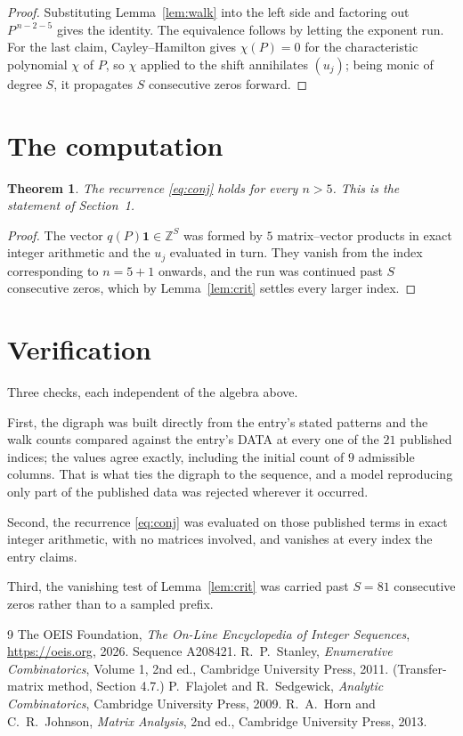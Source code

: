 \documentclass[11pt,a4paper]{article}
\theoremstyle{plain}
\newtheorem{theorem}{Theorem}
\theoremstyle{definition}
\begin{document}
\begin{proof}
Substituting Lemma~\ref{lem:walk} into the left side and factoring out
$P^{\,n-2-5}$ gives the identity. The equivalence follows by letting the exponent
run. For the last claim, Cayley--Hamilton gives $\chi(P)=0$ for the characteristic
polynomial $\chi$ of $P$, so $\chi$ applied to the shift annihilates $(u_j)$; being monic of
degree $S$, it propagates $S$ consecutive zeros forward.
\end{proof}

\section{The computation}

\begin{theorem}
The recurrence \eqref{eq:conj} holds for every $n>5$. This is the statement of
Section~1.
\end{theorem}

\begin{proof}
The vector $q(P)\mathbf{1}\in\mathbb{Z}^{S}$ was formed by $5$ matrix--vector
products in exact integer arithmetic and the $u_j$ evaluated in turn. They vanish from the
index corresponding to $n=5+1$ onwards, and the run was continued past $S$ consecutive
zeros, which by Lemma~\ref{lem:crit} settles every larger index.
\end{proof}

\section{Verification}

Three checks, each independent of the algebra above.

First, the digraph was built directly from the entry's stated patterns and the walk counts
compared against the entry's DATA at every one of the $21$ published indices; the
values agree exactly, including the initial count of $9$ admissible columns. That is
what ties the digraph to the sequence, and a model reproducing only part of the published
data was rejected wherever it occurred.

Second, the recurrence \eqref{eq:conj} was evaluated on those published terms in exact
integer arithmetic, with no matrices involved, and vanishes at every index the entry claims.

Third, the vanishing test of Lemma~\ref{lem:crit} was carried past $S=81$ consecutive
zeros rather than to a sampled prefix.

\begin{thebibliography}{9}
 The OEIS Foundation, \emph{The On-Line Encyclopedia of Integer
Sequences}, \url{https://oeis.org}, 2026. Sequence A208421.
 R.~P.~Stanley, \emph{Enumerative Combinatorics}, Volume 1, 2nd ed.,
Cambridge University Press, 2011. (Transfer-matrix method, Section 4.7.)
 P.~Flajolet and R.~Sedgewick, \emph{Analytic Combinatorics}, Cambridge
University Press, 2009.
 R.~A.~Horn and C.~R.~Johnson, \emph{Matrix Analysis}, 2nd ed., Cambridge
University Press, 2013.
\end{thebibliography}
\end{document}
